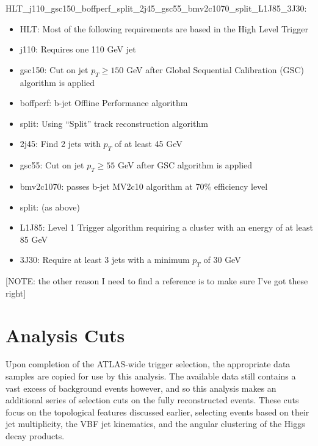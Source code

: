        HLT\_j110\_gsc150\_boffperf\_split\_2j45\_gsc55\_bmv2c1070\_split\_L1J85\_3J30:
        \begin{itemize}
            \item HLT: Most of the following requirements are based in the High Level Trigger
            \item j110: Requires one 110 GeV jet
            \item gsc150: Cut on jet $p_T \geq 150$ GeV after Global Sequential Calibration (GSC) algorithm is applied
            \item boffperf: b-jet Offline Performance algorithm
            \item split: Using ``Split'' track reconstruction algorithm
            \item 2j45: Find 2 jets with $p_T$ of at least 45 GeV
            \item gsc55: Cut on jet $p_T \geq 55$ GeV after GSC algorithm is applied
            \item bmv2c1070: passes b-jet MV2c10 algorithm at 70\% efficiency level
            \item split: (as above)
            \item L1J85: Level 1 Trigger algorithm requiring a cluster with an energy of at least 85 GeV 
            \item 3J30: Require at least 3 jets with a minimum $p_T$ of 30 GeV
        \end{itemize}
        [NOTE: the other reason I need to find a reference is to make sure I've got these right]


        



    \section{Analysis Cuts} \label{sec:analysis_cuts}

        Upon completion of the ATLAS-wide trigger selection,
            the appropriate data samples are copied for use by this analysis.
        The available data still contains a vast excess of background events however,
            and so this analysis makes an additional series of selection cuts on the fully reconstructed events.
        These cuts focus on the topological features discussed earlier,
            selecting events based on their jet multiplicity,
            the VBF jet kinematics,
            and the angular clustering of the Higgs decay products.

